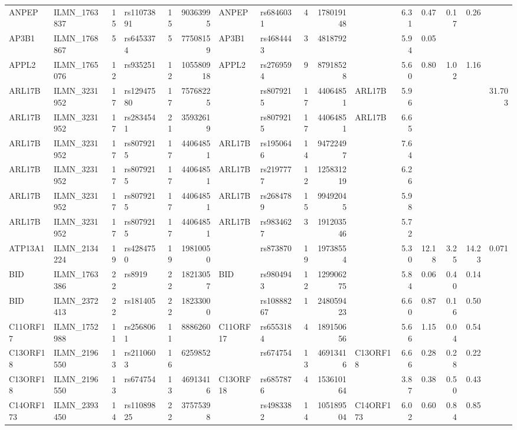 \documentclass{article}
\begin{document}
\begin{landscape}
{\begin{ThreePartTable}
\begin{longtable}{|llr|lrrl|lrrl|rrrr|r|}
ANPEP & ILMN\_1763837 & 15 & rs11073891 & 15 & 90363995 & ANPEP & rs6846031 & 4 & 178019148 &  & 6.31 & 0.47 & 0.17 & 0.26 &  \\
AP3B1 & ILMN\_1768867 & 5 & rs6453374 & 5 & 77508159 & AP3B1 & rs4684443 & 3 & 4818792 &  & 5.94 & 0.05 &  &  &  \\
APPL2 & ILMN\_1765076 & 12 & rs935251 & 12 & 105580918 & APPL2 & rs2769594 & 9 & 87918528 &  & 5.60 & 0.80 & 1.02 & 1.16 &  \\
ARL17B & ILMN\_3231952 & 17 & rs12947580 & 17 & 75768225 &  & rs8079215 & 17 & 44064851 & ARL17B & 5.96 &  &  &  & 31.703 \\
ARL17B & ILMN\_3231952 & 17 & rs2834541 & 21 & 35932619 &  & rs8079215 & 17 & 44064851 & ARL17B & 6.65 &  &  &  &  \\
ARL17B & ILMN\_3231952 & 17 & rs8079215 & 17 & 44064851 & ARL17B & rs1950646 & 14 & 94722497 &  & 7.64 &  &  &  &  \\
ARL17B & ILMN\_3231952 & 17 & rs8079215 & 17 & 44064851 & ARL17B & rs2197777 & 12 & 125831219 &  & 6.26 &  &  &  &  \\
ARL17B & ILMN\_3231952 & 17 & rs8079215 & 17 & 44064851 & ARL17B & rs2684789 & 15 & 99492045 &  & 5.98 &  &  &  &  \\
ARL17B & ILMN\_3231952 & 17 & rs8079215 & 17 & 44064851 & ARL17B & rs9834627 & 3 & 191203546 &  & 5.72 &  &  &  &  \\
ATP13A1 & ILMN\_2134224 & 19 & rs4284750 & 19 & 19810050 &  & rs873870 & 19 & 19738554 &  & 5.30 & 12.18 & 3.25 & 14.23 & 0.071 \\
BID & ILMN\_1763386 & 22 & rs8919 & 22 & 18213057 & BID & rs9804943 & 12 & 129906275 &  & 5.84 & 0.06 & 0.40 & 0.14 &  \\
BID & ILMN\_2372413 & 22 & rs181405 & 22 & 18233000 &  & rs10888267 & 1 & 248059423 &  & 6.60 & 0.87 & 0.16 & 0.50 &  \\
C11ORF17 & ILMN\_1752988 & 11 & rs2568061 & 11 & 8886260 & C11ORF17 & rs6553184 & 4 & 189150656 &  & 5.66 & 1.15 & 0.04 & 0.54 &  \\
C13ORF18 & ILMN\_2196550 & 13 & rs2110603 & 16 & 6259852 &  & rs674754 & 13 & 46913416 & C13ORF18 & 6.66 & 0.28 & 0.28 & 0.22 &  \\
C13ORF18 & ILMN\_2196550 & 13 & rs674754 & 13 & 46913416 & C13ORF18 & rs6857876 & 4 & 153610164 &  & 3.87 & 0.38 & 0.50 & 0.43 &  \\
C14ORF173 & ILMN\_2393450 & 14 & rs11089825 & 22 & 37575398 &  & rs4983382 & 14 & 105189504 & C14ORF173 & 6.02 & 0.60 & 0.84 & 0.85 &  \\

\end{longtable}
\end{ThreePartTable}}
\end{landscape}
\end{document}
